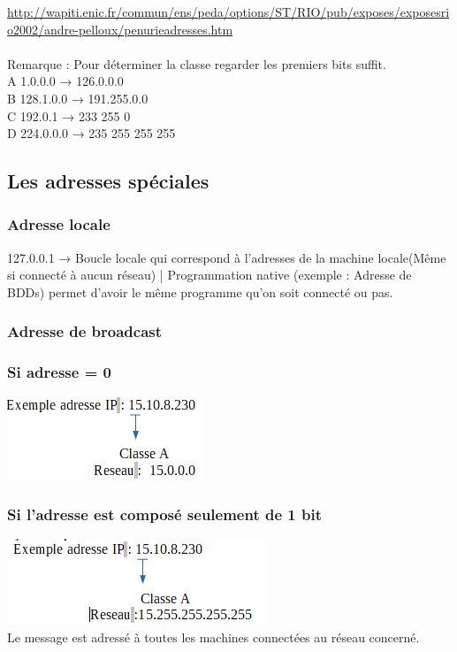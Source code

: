 \documentclass{article}
\begin{document}
\url{http://wapiti.enic.fr/commun/ens/peda/options/ST/RIO/pub/exposes/exposesrio2002/andre-pelloux/penurieadresses.htm} \\
\\
Remarque : Pour déterminer la classe regarder les premiers bits suffit. \\
A 1.0.0.0 → 126.0.0.0 \\
B 128.1.0.0 → 191.255.0.0 \\
C 192.0.1 → 233 255 0 \\
D 224.0.0.0 → 235 255 255 255 \\

\newpage
\subsection{Les adresses spéciales}
\subsubsection{Adresse locale}
127.0.0.1 → Boucle locale qui correspond à l’adresses de la machine locale(Même si connecté à aucun réseau) | Programmation native (exemple : Adresse de BDDs) permet d’avoir le même programme qu’on soit connecté ou pas.
\subsubsection{Adresse de broadcast}
\subsubsection*{Si adresse = 0}
\includegraphics{B1.png}
\subsubsection*{Si l'adresse est composé seulement de 1 bit}
\includegraphics{B2.png}\\
Le message est adressé à toutes les machines connectées au réseau concerné.
\end{document}
